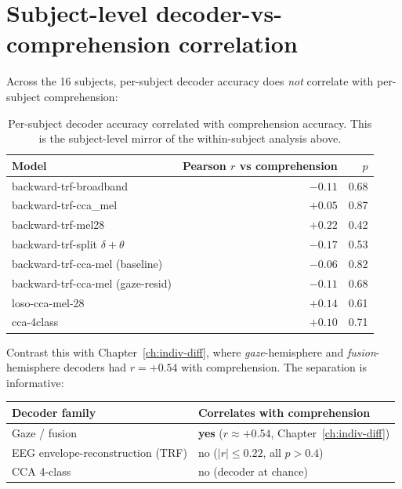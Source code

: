 \section{Subject-level decoder-vs-comprehension correlation}

Across the 16 subjects, per-subject decoder accuracy does \emph{not}
correlate with per-subject comprehension:

\begin{table}[ht]
\centering
\begin{tabular}{lrr}
\toprule
Model & Pearson $r$ vs comprehension & $p$ \\
\midrule
backward-trf-broadband            & $-0.11$ & 0.68 \\
backward-trf-cca\_mel             & $+0.05$ & 0.87 \\
backward-trf-mel28                & $+0.22$ & 0.42 \\
backward-trf-split $\delta+\theta$ & $-0.17$ & 0.53 \\
backward-trf-cca-mel (baseline)   & $-0.06$ & 0.82 \\
backward-trf-cca-mel (gaze-resid) & $-0.11$ & 0.68 \\
loso-cca-mel-28                   & $+0.14$ & 0.61 \\
cca-4class                        & $+0.10$ & 0.71 \\
\bottomrule
\end{tabular}
\caption{Per-subject decoder accuracy correlated with comprehension
accuracy. This is the subject-level mirror of the within-subject
analysis above.}
\end{table}

Contrast this with Chapter~\ref{ch:indiv-diff}, where
\emph{gaze}-hemisphere and \emph{fusion}-hemisphere decoders had
$r = +0.54$ with comprehension. The separation is informative:

\begin{center}
\begin{tabular}{ll}
\toprule
Decoder family & Correlates with comprehension \\
\midrule
Gaze / fusion                     & \textbf{yes} ($r \approx +0.54$, Chapter~\ref{ch:indiv-diff}) \\
EEG envelope-reconstruction (TRF) & no ($|r| \leq 0.22$, all $p > 0.4$) \\
CCA 4-class                       & no (decoder at chance) \\
\bottomrule
\end{tabular}
\end{center}

